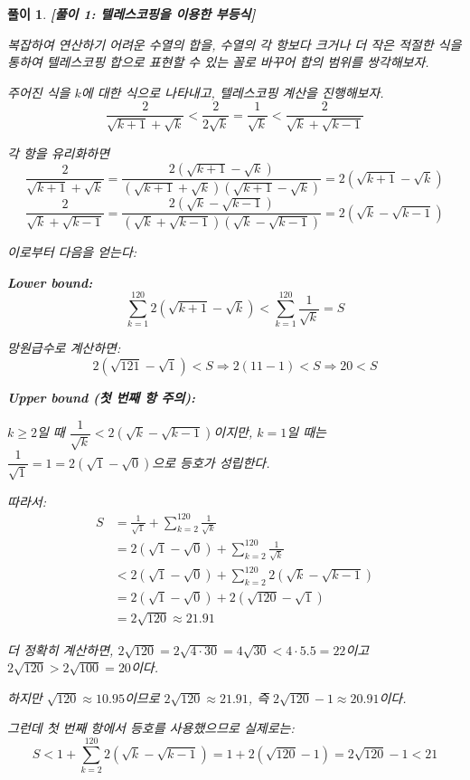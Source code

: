 \documentclass[12pt,a4paper]{article}
\theoremstyle{test_form}
\newtheorem*{solution}{풀이}
\begin{document}
\begin{solution}

\setlength{\parindent}{0pt}

\textbf{[풀이 1: 텔레스코핑을 이용한 부등식]}

복잡하여 연산하기 어려운 수열의 합을, 수열의 각 항보다 크거나 더 작은 적절한 식을 통하여 텔레스코핑 합으로 표현할 수 있는 꼴로 바꾸어 합의 범위를 쌍각해보자.

주어진 식을 \(k\)에 대한 식으로 나타내고, 텔레스코핑 계산을 진행해보자.
\[
\frac{2}{\sqrt{k+1}+\sqrt{k}}<\frac{2}{2\sqrt{k}}=\frac{1}{\sqrt{k}}<\frac{2}{\sqrt{k}+\sqrt{k-1}}
\]

각 항을 유리화하면
\[
\frac{2}{\sqrt{k+1}+\sqrt{k}}=\frac{2(\sqrt{k+1}-\sqrt{k})}{(\sqrt{k+1}+\sqrt{k})(\sqrt{k+1}-\sqrt{k})}=2(\sqrt{k+1}-\sqrt{k})
\]
\[
\frac{2}{\sqrt{k}+\sqrt{k-1}}=\frac{2(\sqrt{k}-\sqrt{k-1})}{(\sqrt{k}+\sqrt{k-1})(\sqrt{k}-\sqrt{k-1})}=2(\sqrt{k}-\sqrt{k-1})
\]

이로부터 다음을 얻는다:

\textbf{Lower bound:}
\[
\sum_{k=1}^{120}2(\sqrt{k+1}-\sqrt{k})<\sum_{k=1}^{120}\frac{1}{\sqrt{k}}=S
\]

망원급수로 계산하면:
\[
2(\sqrt{121}-\sqrt{1})<S \Rightarrow 2(11-1)<S \Rightarrow 20<S
\]

\textbf{Upper bound (첫 번째 항 주의):}

\(k\geq 2\)일 때 \(\dfrac{1}{\sqrt{k}}<2(\sqrt{k}-\sqrt{k-1})\)이지만, \(k=1\)일 때는 \(\dfrac{1}{\sqrt{1}}=1=2(\sqrt{1}-\sqrt{0})\)으로 등호가 성립한다.

따라서:
\[
\begin{aligned}
S&=\frac{1}{\sqrt{1}}+\sum_{k=2}^{120}\frac{1}{\sqrt{k}}\\
&=2(\sqrt{1}-\sqrt{0})+\sum_{k=2}^{120}\frac{1}{\sqrt{k}}\\
&<2(\sqrt{1}-\sqrt{0})+\sum_{k=2}^{120}2(\sqrt{k}-\sqrt{k-1})\\
&=2(\sqrt{1}-\sqrt{0})+2(\sqrt{120}-\sqrt{1})\\
&=2\sqrt{120}\approx 21.91
\end{aligned}
\]

더 정확히 계산하면, \(2\sqrt{120}=2\sqrt{4\cdot 30}=4\sqrt{30}<4\cdot 5.5=22\)이고 \(2\sqrt{120}>2\sqrt{100}=20\)이다.

하지만 \(\sqrt{120}\approx 10.95\)이므로 \(2\sqrt{120}\approx 21.91\), 즉 \(2\sqrt{120}-1\approx 20.91\)이다.

그런데 첫 번째 항에서 등호를 사용했으므로 실제로는:
\[
S<1+\sum_{k=2}^{120}2(\sqrt{k}-\sqrt{k-1})=1+2(\sqrt{120}-1)=2\sqrt{120}-1<21
\]


\end{solution}
\end{document}
